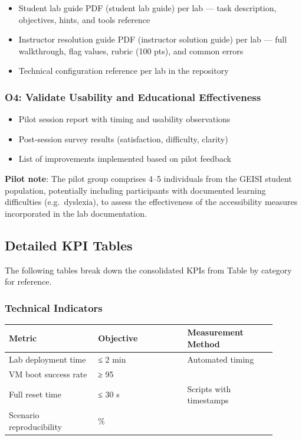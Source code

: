 \begin{itemize}
\tightlist
\item
  Student lab guide PDF (student lab guide) per lab --- task description, objectives, hints, and tools reference
\item
  Instructor resolution guide PDF (instructor solution guide) per lab --- full walkthrough, flag values, rubric (100 pts), and common errors
\item
  Technical configuration reference per lab in the repository
\end{itemize}

\subsubsection{O4: Validate Usability and Educational Effectiveness}

\begin{itemize}
\tightlist
\item
  Pilot session report with timing and usability observations
\item
  Post-session survey results (satisfaction, difficulty, clarity)
\item
  List of improvements implemented based on pilot feedback
\end{itemize}

\textbf{Pilot note}: The pilot group comprises 4--5 individuals from the GEISI student population, potentially including participants with documented learning difficulties (e.g.~dyslexia), to assess the effectiveness of the accessibility measures incorporated in the lab documentation.

\subsection{Detailed KPI Tables}

The following tables break down the consolidated KPIs from Table by category for reference.

\subsubsection{Technical Indicators}

{\footnotesize\begin{longtable}[]{@{}>{\raggedright\arraybackslash}p{0.30\linewidth}
  >{\raggedright\arraybackslash}p{0.30\linewidth}
  >{\raggedright\arraybackslash}p{0.30\linewidth}@{}}
\toprule\noalign{}
\textbf{Metric} & \textbf{Objective} & \textbf{Measurement Method} \\
\midrule\noalign{}
\endhead
\bottomrule\noalign{}
\endlastfoot
Lab deployment time & ≤ 2 min & Automated timing \\
VM boot success rate & ≥ 95 & \\
Full reset time & ≤ 30 s & Scripts with timestamps \\
Scenario reproducibility & 100\% & \\
\end{longtable}}

